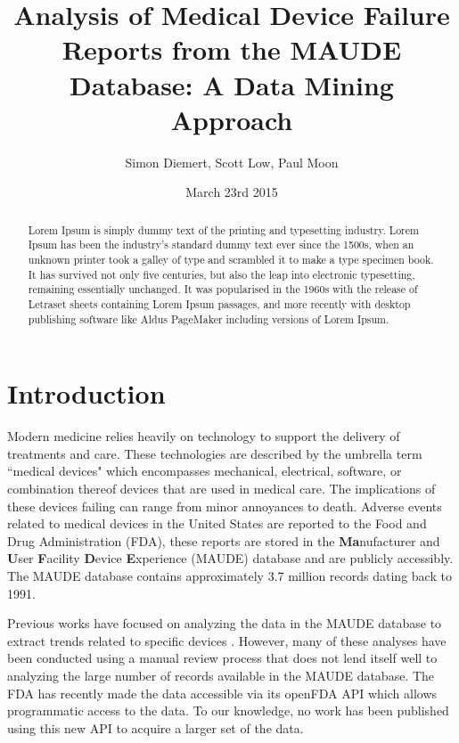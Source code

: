 \documentclass[11pt, notitlepage,abstracton,oneside]{article}   	%
\title{Analysis of Medical Device Failure Reports from the MAUDE Database: A Data Mining Approach}
\author{Simon Diemert, Scott Low, Paul Moon}
\date{March 23rd 2015}							%
\begin{document}
\maketitle

\begin{abstract}


\thispagestyle{empty}
Lorem Ipsum is simply dummy text of the printing and typesetting industry. Lorem Ipsum has been the industry's standard dummy text ever since the 1500s, when an unknown printer took a galley of type and scrambled it to make a type specimen book. It has survived not only five centuries, but also the leap into electronic typesetting, remaining essentially unchanged. It was popularised in the 1960s with the release of Letraset sheets containing Lorem Ipsum passages, and more recently with desktop publishing software like Aldus PageMaker including versions of Lorem Ipsum.
\end{abstract}

\tableofcontents

\clearpage
\newpage
\setcounter{page}{1}
\section{Introduction}
Modern medicine relies heavily on technology to support the delivery of treatments and care. These technologies are described by the umbrella term ``medical devices" which encompasses mechanical, electrical, software, or combination thereof devices that are used in medical care. The implications of these devices failing can range from minor annoyances to death. Adverse events related to medical devices in the United States are reported to the Food and Drug Administration (FDA), these reports are stored in the \textbf{Ma}nufacturer and \textbf{U}ser \textbf{F}acility \textbf{D}evice \textbf{E}xperience (MAUDE) database and are publicly accessibly. The MAUDE database contains approximately 3.7 million records dating back to 1991. 

Previous works have focused on analyzing the data in the MAUDE database to extract trends related to specific devices \cite{weber_preliminary_2011}. However, many of these analyses have been conducted using a manual review process that does not lend itself well to analyzing the large number of records available in the MAUDE database. The FDA has recently made the data accessible via its openFDA API which allows programmatic access to the data. To our knowledge, no work has been published using this new API to acquire a larger set of the data. 
\end{document}
